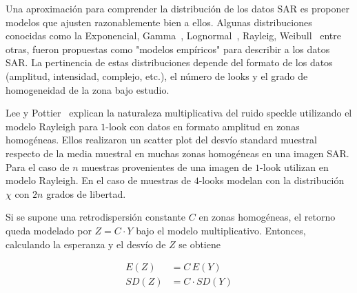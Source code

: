 Una aproximación para comprender la distribución de los datos SAR es proponer modelos que ajusten razonablemente bien a ellos. Algunas distribuciones conocidas como la Exponencial, Gamma~\cite{FreryLibro2019}, Lognormal~\cite{oliverquegan98,Yanasse93}, Rayleig, Weibull~\cite{Lee2009,Yanasse93} entre otras, fueron propuestas como "modelos empíricos" para describir a los datos SAR. La pertinencia de estas distribuciones depende del formato de los datos (amplitud, intensidad, complejo, etc.), el número de looks y el grado de homogeneidad de la zona bajo estudio.

%


Lee y Pottier~\cite{Lee2009} explican la naturaleza multiplicativa del ruido speckle utilizando el modelo Rayleigh para $1$-look con datos en formato amplitud en zonas homogéneas. Ellos realizaron un scatter plot del desvío standard muestral respecto de la media muestral en muchas zonas homogéneas en una imagen SAR. Para el caso de $n$ muestras provenientes de una imagen de $1$-look utilizan en modelo Rayleigh. En el caso de muestras de $4$-looks modelan con la distribución $\chi$ con $2n$ grados de libertad.

Si se supone una retrodispersión constante $C$ en zonas homogéneas, el retorno queda modelado por $Z=C \cdot Y$ bajo el modelo multiplicativo. Entonces, calculando la esperanza y el desvío de $Z$ se obtiene

\begin{align}
E(Z)&=C \, E(Y)\label{esperanza}\\
SD(Z)&=C \cdot SD(Y)\label{desvio}
\end{align} 

